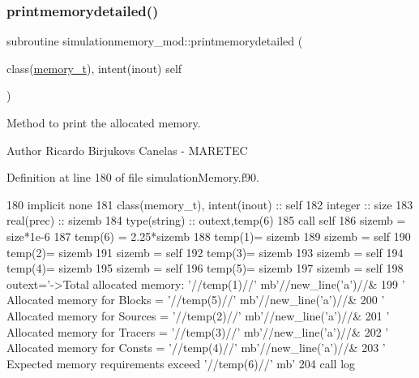 \subsubsection{\texorpdfstring{printmemorydetailed()}{printmemorydetailed()}}
{\footnotesize\ttfamily subroutine simulationmemory\+\_\+mod\+::printmemorydetailed (\begin{DoxyParamCaption}\item[{class(\mbox{\hyperlink{structsimulationmemory__mod_1_1memory__t}{memory\+\_\+t}}), intent(inout)}]{self }\end{DoxyParamCaption})\hspace{0.3cm}{\ttfamily [private]}}



Method to print the allocated memory. 

\begin{DoxyAuthor}{Author}
Ricardo Birjukovs Canelas -\/ M\+A\+R\+E\+T\+EC 
\end{DoxyAuthor}


Definition at line 180 of file simulation\+Memory.\+f90.


\begin{DoxyCode}
180     \textcolor{keywordtype}{implicit none}
181     \textcolor{keywordtype}{class}(memory\_t), \textcolor{keywordtype}{intent(inout)} :: self
182     \textcolor{keywordtype}{integer} :: size
183     \textcolor{keywordtype}{real(prec)} :: sizemb
184     \textcolor{keywordtype}{type}(string) :: outext,temp(6)
185     \textcolor{keyword}{call }self%
186     sizemb = size*1e-6
187     temp(6) = 2.25*sizemb
188     temp(1)= sizemb
189     sizemb = self%
190     temp(2)= sizemb
191     sizemb = self%
192     temp(3)= sizemb
193     sizemb = self%
194     temp(4)= sizemb
195     sizemb = self%
196     temp(5)= sizemb
197     sizemb = self%
198     outext=\textcolor{stringliteral}{'->Total allocated memory: '}//temp(1)//\textcolor{stringliteral}{' mb'}//new\_line(\textcolor{stringliteral}{'a'})//&
199         \textcolor{stringliteral}{'       Allocated memory for Blocks  = '}//temp(5)//\textcolor{stringliteral}{' mb'}//new\_line(\textcolor{stringliteral}{'a'})//&
200         \textcolor{stringliteral}{'       Allocated memory for Sources = '}//temp(2)//\textcolor{stringliteral}{' mb'}//new\_line(\textcolor{stringliteral}{'a'})//&
201         \textcolor{stringliteral}{'       Allocated memory for Tracers = '}//temp(3)//\textcolor{stringliteral}{' mb'}//new\_line(\textcolor{stringliteral}{'a'})//&
202         \textcolor{stringliteral}{'       Allocated memory for Consts  = '}//temp(4)//\textcolor{stringliteral}{' mb'}//new\_line(\textcolor{stringliteral}{'a'})//&
203         \textcolor{stringliteral}{'       Expected memory requirements exceed '}//temp(6)//\textcolor{stringliteral}{' mb'}
204     \textcolor{keyword}{call }log%
\end{DoxyCode}
\mbox{\label{namespacesimulationmemory__mod_a936043befeeb2a3a79b31b519295b842}} 
